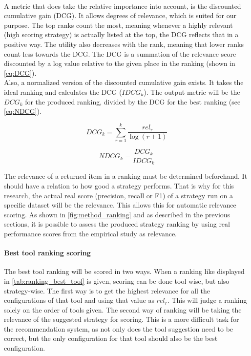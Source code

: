 ~\\A metric that does take the relative importance into account, is the discounted cumulative gain (DCG). It allows degrees of relevance, which is suited for our purpose. The top ranks count the most, meaning whenever a highly relevant (high scoring strategy) is actually listed at the top, the DCG reflects that in a positive way. The utility also decreases with the rank, meaning that lower ranks count less towards the DCG. The DCG is a summation of the relevance score discounted by a log value relative to the given place in the ranking (shown in \autoref{eq:DCG}).
~\\Also, a normalized version of the discounted cumulative gain exists. It takes the ideal ranking and calculates the DCG ($IDCG_k$). The output metric will be the $DCG_k$ for the produced ranking, divided by the DCG for the best ranking (see \autoref{eq:NDCG}). 

\begin{equation}
\label{eq:DCG}
    DCG_k = \sum^k_{r=1} \frac{rel_r}{\log(r+1)}
\end{equation}

\begin{equation}
\label{eq:NDCG}
    NDCG_k = \frac{DCG_k}{IDCG_k}
\end{equation}

The relevance of a returned item in a ranking must be determined beforehand. It should have a relation to how good a strategy performs. 
That is why for this research, the actual real score (precision, recall or F1) of a strategy run on a specific dataset will be the relevance. This allows this for automatic relevance scoring. As shown in \autoref{fig:method_ranking} and as described in the previous sections, it is possible to assess the produced strategy ranking by using real performance scores from the empirical study as relevance.


\paragraph{Best tool ranking scoring} The best tool ranking will be scored in two ways. When a ranking like displayed in \autoref{tab:ranking_best_tool} is given, scoring can be done tool-wise, but also strategy-wise. The first way is to get the highest relevance for all the configurations of that tool and using that value as $rel_r$. This will judge a ranking solely on the order of tools given. The second way of ranking will be taking the relevance of the suggested strategy for scoring. This is a more difficult task for the recommendation system, as not only does the tool suggestion need to be correct, but the only configuration for that tool should also be the best configuration. 

